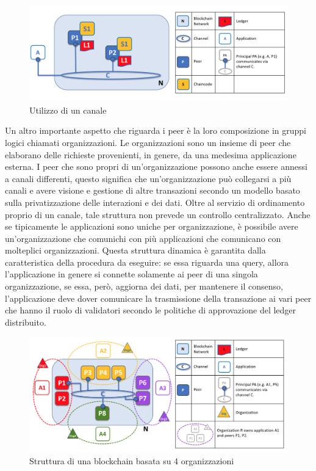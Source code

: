\begin{figure}[h]
    \centering
    \includegraphics[width=1\textwidth]{img/channel-peer-com.png}
    \caption{Utilizzo di un canale}
    \label{fig:channel-peer-diagram}
\end{figure}
Un altro importante aspetto che riguarda i peer è la loro composizione in gruppi logici chiamati organizzazioni. Le organizzazioni sono un insieme di peer che elaborano delle richieste provenienti, in genere, da una medesima applicazione esterna. I peer che sono propri di un'organizzazione possono anche essere annessi a canali differenti, questo significa che un'organizzazione può collegarsi a più canali e avere visione e gestione di altre transazioni secondo un modello basato sulla privatizzazione delle interazioni e dei dati. Oltre al servizio di ordinamento proprio di un canale, tale struttura non prevede un controllo centralizzato. Anche se tipicamente le applicazioni sono uniche per organizzazione, è possibile avere un'organizzazione che comunichi con più applicazioni che comunicano con molteplici organizzazioni. Questa struttura dinamica è garantita dalla caratteristica della procedura da eseguire: se essa riguarda una query, allora l'applicazione in genere si connette solamente ai peer di una singola organizzazione, se essa, però, aggiorna dei dati, per mantenere il consenso, l'applicazione deve dover comunicare la trasmissione della transazione ai vari peer che hanno il ruolo di validatori secondo le politiche di approvazione del ledger distribuito.
\begin{figure}[h]
    \centering
    \includegraphics[width=1\textwidth]{img/organization.png}
    \caption{Struttura di una blockchain basata su 4 organizzazioni}
    \label{fig:org-diagram}
\end{figure}
